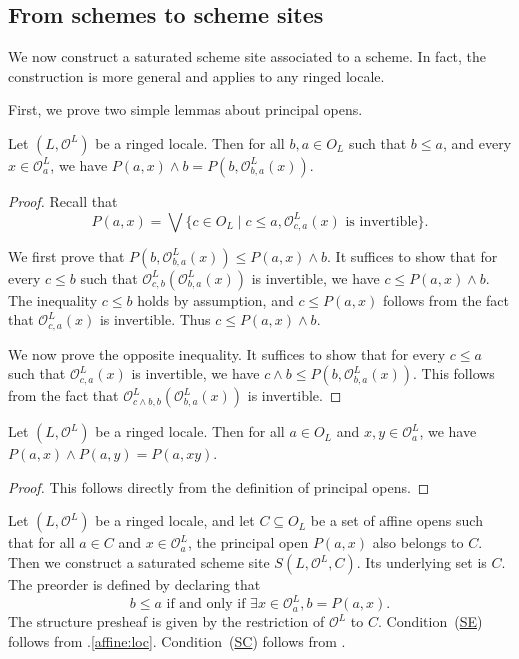 \documentclass[reqno]{amsart}
\newcommand{\axref}[1]{(\hyperref[ax:#1]{#1})}
\theoremstyle{definition}
\theoremstyle{remark}
\numberwithin{figure}{section}
\begin{document}
\subsection{From schemes to scheme sites}
\label{sec:scheme-to-scheme-site}

We now construct a saturated scheme site associated to a scheme. In fact, the construction is more general and applies to any ringed locale.

First, we prove two simple lemmas about principal opens.

\begin{lem}[po-restrict]
Let $(L,\mathcal{O}^L)$ be a ringed locale.
Then for all $b,a \in O_L$ such that $b \leq a$, and every $x \in \mathcal{O}^L_a$, we have $P(a,x) \wedge b = P(b, \mathcal{O}^L_{b,a}(x))$.
\end{lem}
\begin{proof}
Recall that
\[ P(a,x) = \bigvee \{ c \in O_L \mid c \leq a, \mathcal{O}^L_{c,a}(x) \text{ is invertible} \}. \]

We first prove that
$P(b, \mathcal{O}^L_{b,a}(x)) \leq P(a,x) \wedge b$.
It suffices to show that for every $c \leq b$ such that $\mathcal{O}^L_{c,b}(\mathcal{O}^L_{b,a}(x))$ is invertible, we have $c \leq P(a,x) \wedge b$.
The inequality $c \leq b$ holds by assumption, and $c \leq P(a,x)$ follows from the fact that $\mathcal{O}^L_{c,a}(x)$ is invertible.
Thus $c \leq P(a,x) \wedge b$.

We now prove the opposite inequality.
It suffices to show that for every $c \leq a$ such that $\mathcal{O}^L_{c,a}(x)$ is invertible, we have $c \wedge b \leq P(b, \mathcal{O}^L_{b,a}(x))$.
This follows from the fact that $\mathcal{O}^L_{c \wedge b, b}(\mathcal{O}^L_{b,a}(x))$ is invertible.
\end{proof}

\begin{lem}[po-meet]
Let $(L,\mathcal{O}^L)$ be a ringed locale.
Then for all $a \in O_L$ and $x,y \in \mathcal{O}^L_a$, we have $P(a,x) \wedge P(a,y) = P(a, x y)$.
\end{lem}
\begin{proof}
This follows directly from the definition of principal opens.
\end{proof}

Let $(L,\mathcal{O}^L)$ be a ringed locale, and let $C \subseteq O_L$ be a set of affine opens such that
for all $a \in C$ and $x \in \mathcal{O}^L_a$, the principal open $P(a,x)$ also belongs to $C$.
Then we construct a saturated scheme site $S(L,\mathcal{O}^L,C)$.
Its underlying set is $C$.
The preorder is defined by declaring that
\[
b \leq a \text{ if and only if } \exists x \in \mathcal{O}^L_a, b = P(a,x).
\]
The structure presheaf is given by the restriction of $\mathcal{O}^L$ to $C$.
Condition~\axref{SE} follows from .\eqref{affine:loc}.
Condition~\axref{SC} follows from .
\end{document}
